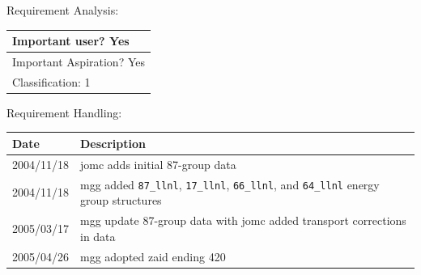 Requirement Analysis:

\begin{tabular}{|p{433pt}|} \hline
Important user? Yes \\ \hline
Important Aspiration? Yes \\ \hline
Classification: 1 \\ \hline
\end{tabular}
\vspace{24pt}

Requirement Handling:

\begin{tabular}{|p{72pt}|p{351pt}|} \hline
Date & Description \\ \hline
2004/11/18 & jomc adds initial 87-group data \\ \hline
2004/11/18 & mgg added \texttt{87\_llnl}, \texttt{17\_llnl},
\texttt{66\_llnl}, and \texttt{64\_llnl} energy group structures \\ \hline
2005/03/17 & mgg update 87-group data with jomc added transport
corrections in data \\ \hline
2005/04/26 & mgg adopted zaid ending 420 \\ \hline
\end{tabular}
